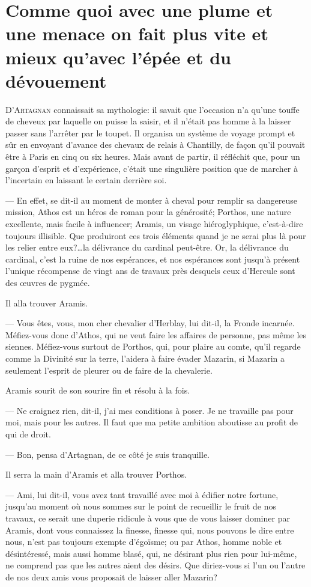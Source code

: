 \chapter[Avec une plume on fait mieux qu'avec l'épée]{Comme quoi avec une plume et une menace on fait plus vite et mieux qu'avec l'épée et du dévouement}

\lettrine{D}{'Artagnan} connaissait sa mythologie: il savait que l'occasion n'a qu'une touffe de cheveux par laquelle on puisse la saisir, et il n'était pas homme à la laisser passer sans l'arrêter par le toupet. Il organisa un système de voyage prompt et sûr en envoyant d'avance des chevaux de relais à Chantilly, de façon qu'il pouvait être à Paris en cinq ou six heures. Mais avant de partir, il réfléchit que, pour un garçon d'esprit et d'expérience, c'était une singulière position que de marcher à l'incertain en laissant le certain derrière soi.

— En effet, se dit-il au moment de monter à cheval pour remplir sa dangereuse mission, Athos est un héros de roman pour la générosité; Porthos, une nature excellente, mais facile à influencer; Aramis, un visage hiéroglyphique, c'est-à-dire toujours illisible. Que produiront ces trois éléments quand je ne serai plus là pour les relier entre eux?\dots la délivrance du cardinal peut-être. Or, la délivrance du cardinal, c'est la ruine de nos espérances, et nos espérances sont jusqu'à présent l'unique récompense de vingt ans de travaux près desquels ceux d'Hercule sont des œuvres de pygmée.

Il alla trouver Aramis.

— Vous êtes, vous, mon cher chevalier d'Herblay, lui dit-il, la Fronde incarnée. Méfiez-vous donc d'Athos, qui ne veut faire les affaires de personne, pas même les siennes. Méfiez-vous surtout de Porthos, qui, pour plaire au comte, qu'il regarde comme la Divinité sur la terre, l'aidera à faire évader Mazarin, si Mazarin a seulement l'esprit de pleurer ou de faire de la chevalerie.

Aramis sourit de son sourire fin et résolu à la fois.

— Ne craignez rien, dit-il, j'ai mes conditions à poser. Je ne travaille pas pour moi, mais pour les autres. Il faut que ma petite ambition aboutisse au profit de qui de droit.

— Bon, pensa d'Artagnan, de ce côté je suis tranquille.

Il serra la main d'Aramis et alla trouver Porthos.

— Ami, lui dit-il, vous avez tant travaillé avec moi à édifier notre fortune, jusqu'au moment où nous sommes sur le point de recueillir le fruit de nos travaux, ce serait une duperie ridicule à vous que de vous laisser dominer par Aramis, dont vous connaissez la finesse, finesse qui, nous pouvons le dire entre nous, n'est pas toujours exempte d'égoïsme; ou par Athos, homme noble et désintéressé, mais aussi homme blasé, qui, ne désirant plus rien pour lui-même, ne comprend pas que les autres aient des désirs. Que diriez-vous si l'un ou l'autre de nos deux amis vous proposait de laisser aller Mazarin?

